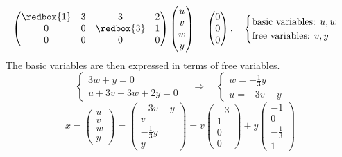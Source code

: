 \begin{itemize}
    \[
    \begin{pmatrix}
        \redbox{1} & 3 & 3 & 2 \\
        0 & 0 & \redbox{3} & 1 \\
        0 & 0 & 0 & 0
    \end{pmatrix} \begin{pmatrix}
        u \\ v \\ w \\ y
    \end{pmatrix} = \begin{pmatrix}
        0 \\ 0 \\ 0
    \end{pmatrix}, \quad \begin{cases}
        \text{basic variables: } u, w \\
        \text{free variables: } v, y
    \end{cases}
    \]
    The basic variables are then expressed in terms of free variables.
    \[
    \begin{cases}
        3w + y = 0 \\
        u + 3v + 3w + 2y = 0
    \end{cases} \quad \Longrightarrow \quad \begin{cases}
        w = -\frac{1}{3} y \\
        u = -3v - y
    \end{cases}
    \]
    \[
    x = \begin{pmatrix}
        u \\ v \\ w \\ y
    \end{pmatrix} = \begin{pmatrix}
        -3v-y \\ v \\ -\frac{1}{3}y \\ y
    \end{pmatrix} = v\begin{pmatrix}
        -3 \\ 1 \\ 0 \\ 0
    \end{pmatrix} + y \begin{pmatrix}
        -1 \\ 0 \\ -\frac{1}{3} \\ 1
    \end{pmatrix}
    \]



\end{itemize}
